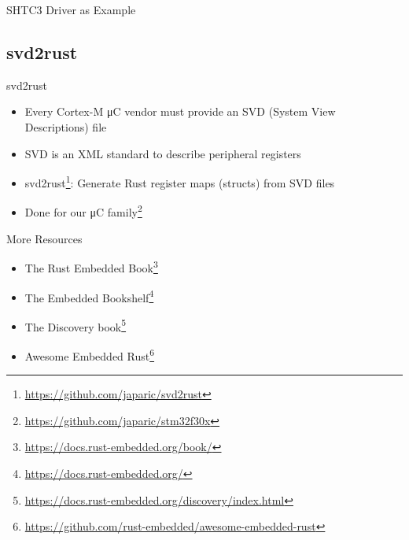 \documentclass[aspectratio=1610,14pt,t]{beamer}
\begin{document}
\begin{frame}[c]{SHTC3 Driver as Example}
\end{frame}

\subsection{svd2rust}

\begin{frame}[c]{svd2rust}
  \begin{itemize}
    \item Every Cortex-M μC vendor must provide an SVD (System View
      Descriptions) file
    \item SVD is an XML standard to describe peripheral registers
    \item svd2rust\footnote{\url{https://github.com/japaric/svd2rust}}:
      Generate Rust register maps (structs) from SVD files
    \item Done for our μC family\footnote{\url{https://github.com/japaric/stm32f30x}}
  \end{itemize}
\end{frame}

\begin{frame}[c]{More Resources}
  \begin{itemize}
    \item The Rust Embedded Book\footnote{\url{https://docs.rust-embedded.org/book/}}
    \item The Embedded Bookshelf\footnote{\url{https://docs.rust-embedded.org/}}
    \item The Discovery book\footnote{\url{https://docs.rust-embedded.org/discovery/index.html}}
    \item Awesome Embedded Rust\footnote{\url{https://github.com/rust-embedded/awesome-embedded-rust}}
  \end{itemize}
\end{frame}
\end{document}
